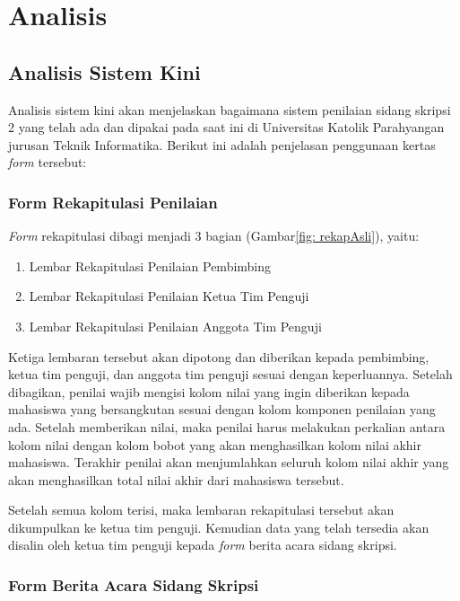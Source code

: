 \chapter{Analisis}
\label{chap: analisis}

\section{Analisis Sistem Kini}
\label{sec: analisiSKini}

Analisis sistem kini akan menjelaskan bagaimana sistem penilaian sidang skripsi 2 yang telah ada dan dipakai pada saat ini di Universitas Katolik Parahyangan jurusan Teknik Informatika. Berikut ini adalah penjelasan penggunaan kertas \textit{form} tersebut:

	\subsection{Form Rekapitulasi Penilaian}
	\label{sub: rekapPenil}
	
	\textit{Form} rekapitulasi dibagi menjadi 3 bagian (Gambar\ref{fig: rekapAsli}), yaitu:
		\begin{enumerate}
			\item Lembar Rekapitulasi Penilaian Pembimbing
			\item Lembar Rekapitulasi Penilaian Ketua Tim Penguji
			\item Lembar Rekapitulasi Penilaian Anggota Tim Penguji
		\end{enumerate}
	
	Ketiga lembaran tersebut akan dipotong dan diberikan kepada pembimbing, ketua tim penguji, dan anggota tim penguji sesuai dengan keperluannya. Setelah dibagikan, penilai wajib mengisi kolom nilai yang ingin diberikan kepada mahasiswa yang bersangkutan sesuai dengan kolom komponen penilaian yang ada. Setelah memberikan nilai, maka penilai harus melakukan perkalian antara kolom nilai dengan kolom bobot yang akan menghasilkan kolom nilai akhir mahasiswa. Terakhir penilai akan menjumlahkan seluruh kolom nilai akhir yang akan menghasilkan total nilai akhir dari mahasiswa tersebut.
	
	Setelah semua kolom terisi, maka lembaran rekapitulasi tersebut akan dikumpulkan ke ketua tim penguji. Kemudian data yang telah tersedia akan disalin oleh ketua tim penguji kepada \textit{form} berita acara sidang skripsi.
	
	\subsection{Form Berita Acara Sidang Skripsi}
	\label{sub: formSkripsi}
	
